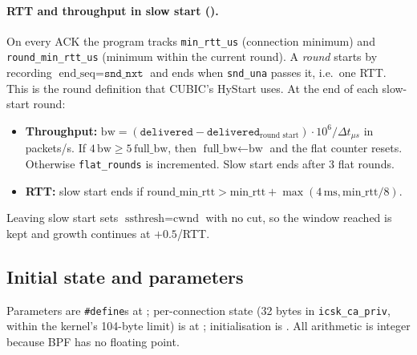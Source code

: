 \documentclass[11pt]{article}
\begin{document}
\paragraph{RTT and throughput in slow start (\grPktsAcked).}
On every ACK the program tracks \texttt{min\_rtt\_us} (connection minimum) and
\texttt{round\_min\_rtt\_us} (minimum within the current round). A \emph{round} starts by recording
$\text{end\_seq}=\texttt{snd\_nxt}$ and ends when \texttt{snd\_una} passes it, i.e.\ one RTT. This is
the round definition that CUBIC's HyStart uses. At the end of each slow-start round:
\begin{itemize}
  \item \textbf{Throughput:} $\text{bw} = (\texttt{delivered} - \texttt{delivered}_{\text{round start}})\cdot 10^6 / \Delta t_{\mu s}$
  in packets/s. If $4\,\text{bw} \ge 5\,\text{full\_bw}$, then $\text{full\_bw}\leftarrow\text{bw}$ and the flat counter resets.
  Otherwise \texttt{flat\_rounds} is incremented. Slow start ends after 3 flat rounds.
  \item \textbf{RTT:} slow start ends if $\text{round\_min\_rtt} > \text{min\_rtt} + \max(4\,\text{ms}, \text{min\_rtt}/8)$.
\end{itemize}
Leaving slow start sets $\text{ssthresh} = \text{cwnd}$ with no cut, so the window reached is kept and
growth continues at $+0.5$/RTT.

\subsection{Initial state and parameters}
Parameters are \texttt{\#define}s at \grParams; per-connection state (32 bytes in
\texttt{icsk\_ca\_priv}, within the kernel's 104-byte limit) is at \grState; initialisation is
\grInit. All arithmetic is integer because BPF has no floating point.
\end{document}
